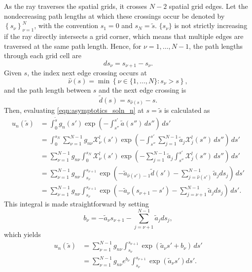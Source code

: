 As the ray traverses the spatial grids, it crosses $N-2$ spatial grid edges.
Let the nondecreasing path lengths at which these crossings occur be denoted by
$\left\{s_\nu\right\}_{\nu=1}^{N}$, with the convention $s_1=0$ and $s_{N}=\tilde{s}$.
$\{s_\nu\}$ is not strictly increasing if the ray directly intersects a grid corner,
which means that multiple edges are traversed at the same path length.
Hence, for $\nu=1,\ldots,N-1$, the path lengths through each grid cell are
\begin{equation*}
  ds_\nu = s_{\nu+1} - s_\nu.
\end{equation*}
Given $s$, the index next edge crossing occurs at
\begin{equation*}
  \hat{\nu}(s) = \min\left\{ \nu \in \{1,\ldots,N\} : s_\nu>s \right\},
\end{equation*}
and the path length between $s$ and the next edge crossing is
\begin{equation*}
  \tilde{d}(s) = s_{\hat{\nu}(s)}-s.
\end{equation*}
Then, evaluating \eqref{eqn:asymptotics_soln_n} at $s=\tilde{s}$ is calculated as
\begin{align*}
  u_n(\tilde{s}) &= \int_0^{\tilde{s}}g_n(s')\exp\left( -\int_{s''}^{s'}\tilde{a}(s'')\,ds'' \right)\, ds' \\
  &= \int_0^{s_N} \sum_{\nu=1}^{N-1}g_{n\nu}\mathcal{X}^l_\nu(s') \exp\left( -\int_{s''}^{s'}\sum_{j=1}^{N-1}\tilde{a}_{j}\mathcal{X}^l_j(s'')\,ds'' \right)\, ds' \\
  &= \sum_{\nu=1}^{N-1}g_{n\nu}\int_0^{s_N} \mathcal{X}^l_\nu(s') \exp\left( -\sum_{j=1}^{N-1}\tilde{a}_{j}\int_{s''}^{s'}\mathcal{X}^l_j(s'')\,ds'' \right)\, ds' \\
  &= \sum_{\nu=1}^{N-1}g_{n\nu}\int_{s_\nu}^{s_{\nu+1}}  \exp\left(-\tilde{a}_{\hat{\nu}(s')-1}\tilde{d}(s') -\sum_{j=\hat{\nu}(s')}^{N-1}\tilde{a}_{j}ds_j\right)\, ds' \\
  &= \sum_{\nu=1}^{N-1}g_{n\nu}\int_{s_\nu}^{s_{\nu+1}}  \exp\left(-\tilde{a}_{\nu}(s_{\nu+1}-s') -\sum_{j=\nu+1}^{N-1}\tilde{a}_{j}ds_j\right)\, ds'.
\end{align*}
This integral is made straightforward by setting
\begin{equation*}
  b_\nu = -\tilde{a}_{\nu}s_{\nu+1} - \sum_{j=\nu+1}^{N-1}\tilde{a}_{j}ds_j,
\end{equation*}
which yields
\begin{align*}
  u_n(\tilde{s}) &= \sum_{\nu=1}^{N-1}g_{n\nu}\int_{s_\nu}^{s_{\nu+1}}  \exp\left(\tilde{a}_{\nu}s' + b_\nu\right)\, ds' \\
                 &= \sum_{\nu=1}^{N-1}g_{n\nu}e^{b_\nu}\int_{s_\nu}^{s_{\nu+1}}  \exp\left(\tilde{a}_{\nu}s'\right) ds'.
\end{align*}
